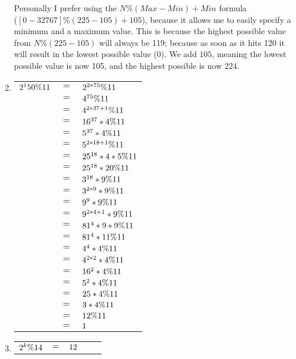 \documentclass[8pt,a4paper]{article}
\begin{document}
\begin{enumerate}[itemsep=20pt]
	Personally I prefer using the $N\%(Max-Min)+Min$ formula\\ ($[0-32767]\%(225-105)+105$), because it allows me to easily specify a minimum and a maximum value. This is 				 because the highest possible value from $N\%(225-105)$ will always be 119; because as soon as it hits 120 it will result in the lowest possible value (0). We add 					 $105$, meaning the lowest possible value is now 105, and the highest possible is now 224.		
\item
	\begin{tabular}[t]{l c l}
		\($$2^150\%11$$\) & \(=\) &\($$2^{2*75}\%11$$\)\\
					  & \(=\) &\($$4^{75}\%11$$\)\\
					  & \(=\) & \($$4^{2*37+1}\%11$$\)\\
					  & \(=\) & \($$16^{37}*4\%11$$\)\\
					  & \(=\) & \($$5^{37}*4\%11$$\)\\
					  & \(=\) & \($$5^{2*18+1}\%11$$\)\\
					  & \(=\) & \($$25^{18}*4*5\%11$$\)\\
					  & \(=\) & \($$25^{18}*20\%11$$\)\\
					  & \(=\) & \($$3^{18}*9\%11$$\)\\
					  & \(=\) & \($$3^{2*9}*9\%11$$\)\\
					  & \(=\) & \($$9^9*9\%11$$\)\\
					  & \(=\) & \($$9^{2*4+1}*9\%11$$\)\\
					  & \(=\) & \($$81^4*9*9\%11$$\)\\
					  & \(=\) & \($$81^4*11\%11$$\)\\
					  & \(=\) & \($$4^4*4\%11$$\)\\
					  & \(=\) & \($$4^{2*2}*4\%11$$\)\\
					  & \(=\) & \($$16^2*4\%11$$\)\\
					  & \(=\) & \($$5^2*4\%11$$\)\\
					  & \(=\) & \($$25*4\%11$$\)\\
					  & \(=\) & \($$3*4\%11$$\)\\
					  & \(=\) & \($$12\%11$$\)\\
					  & \(=\) & \($$1$$\)\\
	\end{tabular}
\item
	\begin{tabular}[t]{l c l c r}
		\($$2^k\%14$$\) & \($$=$$\) & \($$12$$\) & \(\) & \(\) \\

\end{tabular}
\end{enumerate}
\end{document}
